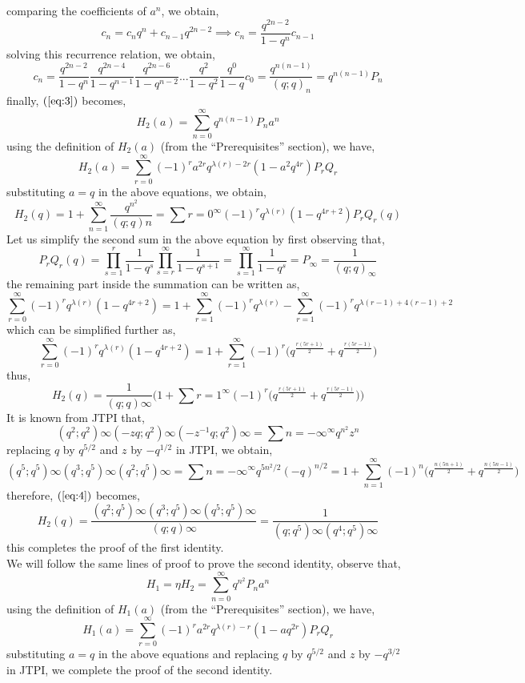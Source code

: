 \documentclass[12pt]{article}
\begin{document}
comparing the coefficients of $a^n$, we obtain,
$$c_n=c_nq^n+c_{n-1}q^{2n-2}\implies c_n=\frac{q^{2n-2}}{1-q^n}c_{n-1} $$
solving this recurrence relation, we obtain,
$$c_n=\frac{q^{2n-2}}{1-q^n}\frac{q^{2n-4}}{1-q^{n-1}}\frac{q^{2n-6}}{1-q^{n-2}}...\frac{q^2}{1-q^2}\frac{q^0}{1-q}c_0=\frac{q^{n(n-1)}}{(q;q)_n}=q^{n(n-1)}P_n$$
finally, $(\ref{eq:3})$ becomes,
$$H_2(a)=\sum_{n=0}^{\infty}q^{n(n-1)}P_na^n$$
using the definition of $H_2(a)$ (from the \enquote{Prerequisites} section), we have,
$$H_2(a)=\sum_{r=0}^{\infty}(-1)^ra^{2r}q^{\lambda(r)-2r}(1-a^2q^{4r})P_rQ_r$$
substituting $a=q$ in the above equations, we obtain,
$$H_2(q)=1+\sum_{n=1}^{\infty}\frac{q^{n^2}}{(q;q)n}=\sum{r=0}^{\infty}(-1)^rq^{\lambda(r)}(1-q^{4r+2})P_rQ_r(q)$$
Let us simplify the second sum in the above equation by first observing that,
$$P_rQ_r(q)=\prod_{s=1}^{r}\frac{1}{1-q^s}\prod_{s=r}^{\infty}\frac{1}{1-q^{s+1}}=\prod_{s=1}^{\infty}\frac{1}{1-q^s}=P_{\infty}=\frac{1}{(q;q)_{\infty}}$$
the remaining part inside the summation can be written as,
$$\sum_{r=0}^{\infty}(-1)^rq^{\lambda(r)}(1-q^{4r+2})=1+\sum_{r=1}^{\infty}(-1)^rq^{\lambda(r)}-\sum_{r=1}^{\infty}(-1)^rq^{\lambda(r-1)+4(r-1)+2}$$
which can be simplified further as,
$$\sum_{r=0}^{\infty}(-1)^rq^{\lambda(r)}(1-q^{4r+2})=1+\sum_{r=1}^{\infty}(-1)^r\Bigg(q^{\frac{r(5r+1)}{2}}+q^{\frac{r(5r-1)}{2}}\Bigg)$$
thus,
\begin{equation}  \label{eq:4}
H_2(q)=\frac{1}{(q;q){\infty}}\Bigg(1+\sum{r=1}^{\infty}(-1)^r\Bigg(q^{\frac{r(5r+1)}{2}}+q^{\frac{r(5r-1)}{2}}\Bigg)\Bigg)
\end{equation}
It is known from JTPI that,
$$(q^2;q^2){\infty}(-zq;q^2){\infty}(-z^{-1}q;q^2){\infty}=\sum{n=-\infty}^{\infty}q^{n^2}z^n$$
replacing $q$ by $q^{5/2}$ and $z$ by $-q^{1/2}$ in JTPI, we obtain,
$$(q^5;q^5){\infty}(q^3;q^5){\infty}(q^2;q^5){\infty}=\sum{n=-\infty}^{\infty}q^{5n^2/2}(-q)^{n/2}=1+\sum_{n=1}^{\infty}(-1)^n\Bigg(q^{\frac{n(5n+1)}{2}}+q^{\frac{n(5n-1)}{2}}\Bigg)$$
therefore, $(\ref{eq:4})$ becomes,
$$H_2(q)=\frac{(q^2;q^5){\infty}(q^3;q^5){\infty}(q^5;q^5){\infty}}{(q;q){\infty}}=\frac{1}{(q;q^5){\infty}(q^4;q^5){\infty}}$$
this completes the proof of the first identity.\\
We will follow the same lines of proof to prove the second identity, observe that,
$$H_1=\eta H_2=\sum_{n=0}^{\infty}q^{n^2}P_na^n$$
using the definition of $H_1(a)$ (from the “Prerequisites” section), we have,
$$H_1(a)=\sum_{r=0}^{\infty}(-1)^ra^{2r}q^{\lambda(r)-r}(1-aq^{2r})P_rQ_r$$
substituting $a=q$ in the above equations and replacing $q$ by $q^{5/2}$ and $z$ by $-q^{3/2}$ in JTPI, we complete the proof of the second identity.
\end{document}
